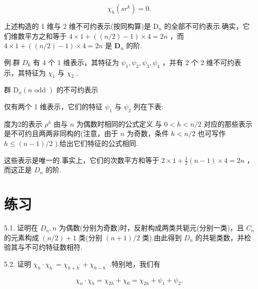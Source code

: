 \documentclass[10pt]{article}
\begin{document}
\[
{\chi }_{h}\left( {s{r}^{k}}\right)  = 0.
\]

上述构造的 1 维与 2 维不可约表示(按同构算)是 \({\mathrm{D}}_{n}\) 的全部不可约表示.确实，它们维数平方之和等于 \(4 \times  1 + \left( {\left( {n/2}\right)  - 1}\right)  \times  4 = {2n}\) ，而 \(4 \times  1 + \left( {\left( {n/2}\right)  - 1}\right)  \times  4 = {2n}\) 是 \({\mathbf{D}}_{n}\) 的阶.

例.群 \({D}_{6}\) 有 4 个 1 维表示，其特征为 \({\psi }_{1},{\psi }_{2},{\psi }_{3},{\psi }_{4}\) ，并有 2 个 2 维不可约表示，其特征为 \({\chi }_{1}\) 与 \({\chi }_{2}\) .

群 \({\mathrm{D}}_{n}\left( {n\text{ odd }}\right)\) 的不可约表示

仅有两个 1 维表示，它们的特征 \({\psi }_{1}\) 与 \({\psi }_{2}\) 列在下表:

\begin{center}
\end{center}

度为2的表示 \({\rho }^{h}\) 由与 \(n\) 为偶数时相同的公式定义.与 \(0 < h < n/2\) 对应的那些表示是不可约且两两非同构的(注意，由于 \(n\) 为奇数，条件 \(h < n/2\) 也可写作 \(h \leq  \left( {n - 1}\right) /2\) ).给出它们特征的公式相同.

这些表示是唯一的.事实上，它们的次数平方和等于 \(2 \times  1 + \frac{1}{2}\left( {n - 1}\right)  \times  4 = {2n}\) ，而这正是 \({D}_{n}\) 的阶.

\section*{练习}

5.1. 证明在 \({D}_{n},n\) 为偶数(分别为奇数)时，反射构成两类共轭元(分别一类)，且 \({C}_{n}\) 的元素构成 \(\left( {n/2}\right)  + 1\) 类(分别 \(\left( {n + 1}\right) /2\) 类).由此得到 \({D}_{n}\) 的共轭类数，并检验其与不可约特征数相符.

5.2. 证明 \({\chi }_{h} \cdot  {\chi }_{{h}^{\prime }} = {\chi }_{h + {h}^{\prime }} + {\chi }_{h - {h}^{\prime }}\) .特别地，我们有

\[
{\chi }_{n} \cdot  {\chi }_{h} = {\chi }_{2h} + {\chi }_{0} = {\chi }_{2h} + {\psi }_{1} + {\psi }_{2}.
\]
\end{document}
